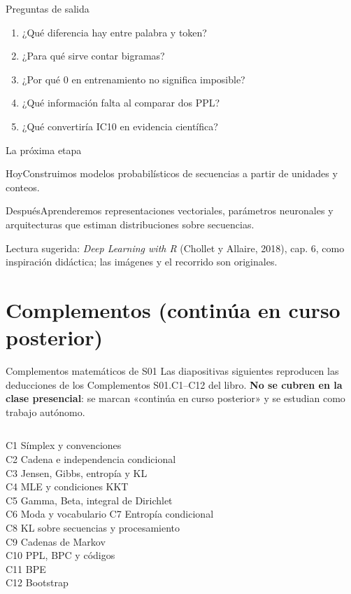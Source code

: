 \documentclass[aspectratio=169,10pt]{beamer}
\begin{document}
\begin{frame}{Preguntas de salida}
\begin{enumerate}\item ¿Qué diferencia hay entre palabra y token?\item ¿Para qué sirve contar bigramas?\item ¿Por qué $0$ en entrenamiento no significa imposible?\item ¿Qué información falta al comparar dos PPL?\item ¿Qué convertiría IC10 en evidencia científica?\end{enumerate}
\end{frame}

\begin{frame}{La próxima etapa}
\begin{block}{Hoy}\centering Construimos modelos probabilísticos de secuencias a partir de unidades y conteos.\end{block}
\begin{block}{Después}\centering Aprenderemos representaciones vectoriales, parámetros neuronales y arquitecturas que estiman distribuciones sobre secuencias.\end{block}
\small\centering Lectura sugerida: \emph{Deep Learning with R} (Chollet y Allaire, 2018), cap. 6, como inspiración didáctica; las imágenes y el recorrido son originales.
\end{frame}

\section{Complementos (continúa en curso posterior)}
\begin{frame}{Complementos matemáticos de S01}
Las diapositivas siguientes reproducen las deducciones de los Complementos S01.C1--C12
del libro. \textbf{No se cubren en la clase presencial}: se marcan
«continúa en curso posterior» y se estudian como trabajo autónomo.
\medskip
\begin{columns}[T]\small
{}C1 Símplex y convenciones\\ C2 Cadena e independencia condicional\\ C3 Jensen, Gibbs, entropía y KL\\ C4 MLE y condiciones KKT\\ C5 Gamma, Beta, integral de Dirichlet\\ C6 Moda y vocabulario
C7 Entropía condicional\\ C8 KL sobre secuencias y procesamiento\\ C9 Cadenas de Markov\\ C10 PPL, BPC y códigos\\ C11 BPE\\ C12 Bootstrap
\end{columns}
\end{frame}
\end{document}

